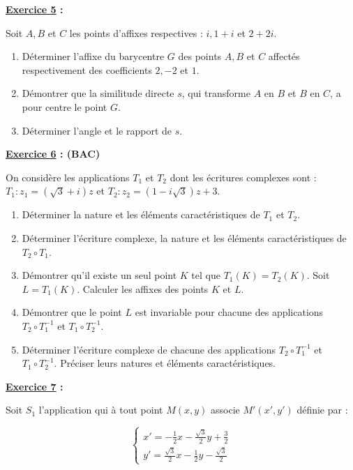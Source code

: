 \documentclass[12pt,a4paper]{article}
\begin{document}
\textbf{\underline{Exercice 5} :}

\bigskip

Soit \( A, B \) et \( C \) les points d’affixes respectives :  
\( i, 1 + i \) et \( 2 + 2i \).

\begin{enumerate}
    \item Déterminer l’affixe du barycentre \( G \) des points \( A, B \) et \( C \) affectés respectivement des coefficients \( 2, -2 \) et \( 1 \).
    \item Démontrer que la similitude directe \( s \), qui transforme \( A \) en \( B \) et \( B \) en \( C \), a pour centre le point \( G \).
    \item Déterminer l’angle et le rapport de \( s \).
\end{enumerate}

\textbf{\underline{Exercice 6} : (BAC)}

\bigskip

On considère les applications \( T_1 \) et \( T_2 \) dont les écritures complexes sont :  
\( T_1 : z_1 = (\sqrt{3} + i)z \) et \( T_2 : z_2 = (1 - i\sqrt{3})z + 3 \).

\begin{enumerate}
    \item Déterminer la nature et les éléments caractéristiques de \( T_1 \) et \( T_2 \).
    \item Déterminer l’écriture complexe, la nature et les éléments caractéristiques de \( T_2 \circ T_1 \).
    \item Démontrer qu’il existe un seul point \( K \) tel que \( T_1(K) = T_2(K) \). Soit \( L = T_1(K) \).  
          Calculer les affixes des points \( K \) et \( L \).
    \item Démontrer que le point \( L \) est invariable pour chacune des applications \( T_2 \circ T_1^{-1} \) et \( T_1 \circ T_2^{-1} \).
    \item Déterminer l’écriture complexe de chacune des applications \( T_2 \circ T_1^{-1} \) et \( T_1 \circ T_2^{-1} \).  
          Préciser leurs natures et éléments caractéristiques.
\end{enumerate}

\bigskip

\textbf{\underline{Exercice 7} :}

\bigskip

Soit \( S_1 \) l’application qui à tout point \( M(x,y) \) associe \( M'(x',y') \) définie par :

\[
\begin{cases}
    x' = -\frac{1}{2}x - \frac{\sqrt{3}}{2}y + \frac{3}{2} \\
    y' = \frac{\sqrt{3}}{2}x - \frac{1}{2}y - \frac{\sqrt{3}}{2}
\end{cases}
\]
\end{document}
